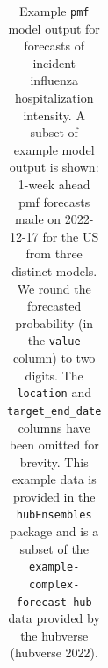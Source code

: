 \documentclass[
]{article}
\begin{document}
\begin{longtable}[]{@{}
  >{\raggedright\arraybackslash}p{}
  >{\raggedright\arraybackslash}p{}
  >{\raggedleft\arraybackslash}p{}
  >{\raggedright\arraybackslash}p{}
  >{\raggedright\arraybackslash}p{}
  >{\raggedright\arraybackslash}p{}
  >{\raggedleft\arraybackslash}p{}@{}}

\caption{\label{tbl-example-forecasts-pmf}Example \texttt{pmf} model
output for forecasts of incident influenza hospitalization intensity. A
subset of example model output is shown: 1-week ahead pmf forecasts made
on 2022-12-17 for the US from three distinct models. We round the
forecasted probability (in the \texttt{value} column) to two digits. The
\texttt{location} and \texttt{target\_end\_date} columns have been
omitted for brevity. This example data is provided in the
\texttt{hubEnsembles} package and is a subset of the
\texttt{example-complex-forecast-hub} data provided by the hubverse
(hubverse 2022).}

\tabularnewline


\end{longtable}
\end{document}
